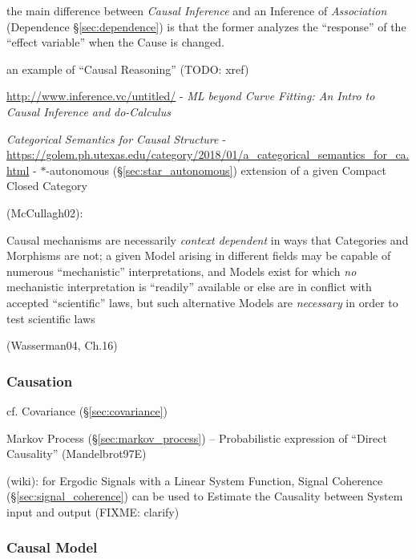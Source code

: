 the main difference between \emph{Causal Inference} and an Inference of
\emph{Association} (Dependence \S\ref{sec:dependence}) is that the former
analyzes the ``response'' of the ``effect variable'' when the Cause is changed.

an example of ``Causal Reasoning'' (TODO: xref)

\url{http://www.inference.vc/untitled/} - \emph{ML beyond Curve Fitting: An
  Intro to Causal Inference and do-Calculus}

\emph{Categorical Semantics for Causal Structure} -
\url{https://golem.ph.utexas.edu/category/2018/01/a_categorical_semantics_for_ca.html}
- $*$-autonomous (\S\ref{sec:star_autonomous}) extension of a given Compact
Closed Category

(McCullagh02):

Causal mechanisms are necessarily \emph{context dependent} in ways that
Categories and Morphisms are not;
a given Model arising in different fields may be capable of numerous
``mechanistic'' interpretations, and Models exist for which \emph{no}
mechanistic interpretation is ``readily'' available or else are in conflict
with accepted ``scientific'' laws, but such alternative Models are
\emph{necessary} in order to test scientific laws

(Wasserman04, Ch.16)



\subsubsection{Causation}\label{sec:causation}


cf. Covariance (\S\ref{sec:covariance})

Markov Process (\S\ref{sec:markov_process}) -- Probabilistic expression of
``Direct Causality'' (Mandelbrot97E)

\fist (wiki): for Ergodic Signals with a Linear System Function, Signal
Coherence (\S\ref{sec:signal_coherence}) can be used to Estimate the Causality
between System input and output (FIXME: clarify)



\subsubsection{Causal Model}\label{sec:causal_model}




